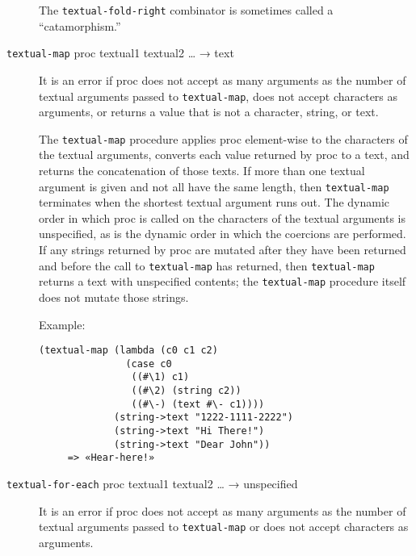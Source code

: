 \begin{description}
The \texttt{textual-fold-right} combinator is sometimes called a
``catamorphism.''
\item[ \href{}{} \texttt{textual-map} proc textual1 textual2 \ldots{} →
text ]
It is an error if proc does not accept as many arguments as the number
of textual arguments passed to \texttt{textual-map}, does not accept
characters as arguments, or returns a value that is not a character,
string, or text.

The \texttt{textual-map} procedure applies proc element-wise to the
characters of the textual arguments, converts each value returned by
proc to a text, and returns the concatenation of those texts. If more
than one textual argument is given and not all have the same length,
then \texttt{textual-map} terminates when the shortest textual argument
runs out. The dynamic order in which proc is called on the characters of
the textual arguments is unspecified, as is the dynamic order in which
the coercions are performed. If any strings returned by proc are mutated
after they have been returned and before the call to
\texttt{textual-map} has returned, then \texttt{textual-map} returns a
text with unspecified contents; the \texttt{textual-map} procedure
itself does not mutate those strings.

Example:

\begin{verbatim}
(textual-map (lambda (c0 c1 c2)
               (case c0
                ((#\1) c1)
                ((#\2) (string c2))
                ((#\-) (text #\- c1))))
             (string->text "1222-1111-2222")
             (string->text "Hi There!")
             (string->text "Dear John"))
     => «Hear-here!»
\end{verbatim}
\item[ \href{}{} \texttt{textual-for-each} proc textual1 textual2
\ldots{} → unspecified ]
It is an error if proc does not accept as many arguments as the number
of textual arguments passed to \texttt{textual-map} or does not accept
characters as arguments.


\end{description}
